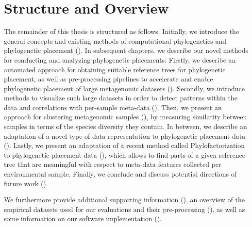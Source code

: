 \section{Structure and Overview}
\label{ch:Introduction:sec:StructureOverview}

The remainder of this thesis is structured as follows.
Initially, we introduce the general concepts and existing methods
of computational phylogenetics and phylogenetic placement ().
In subsequent chapters, we describe our novel methods for conducting and analyzing phylogenetic placements:
Firstly, we describe an automated approach for obtaining suitable reference trees for phylogenetic placement,
as well as pre-processing pipelines to accelerate and enable
phylogenetic placement of large metagenomic datasets ().
Secondly, we introduce methods to visualize such large datasets
in order to detect patterns within the data and correlations with per-sample meta-data ().
Then, we present an approach for clustering metagenomic samples (),
by measuring similarity between samples in terms of the species diversity they contain.
In between, we describe an adaptation of a novel type of data representation
to phylogenetic placement data ().
Lastly, we present an adaptation of a recent method called Phylofactorization
to phylogenetic placement data (),
which allows to find parts of a given reference tree
that are meaningful with respect to meta-data features collected per environmental sample.
Finally, we conclude and discuss potential directions of future work ().

We furthermore provide additional supporting information (),
an overview of the empirical datasets used for our evaluations and their pre-processing (),
as well as some information on our software implementation ().




